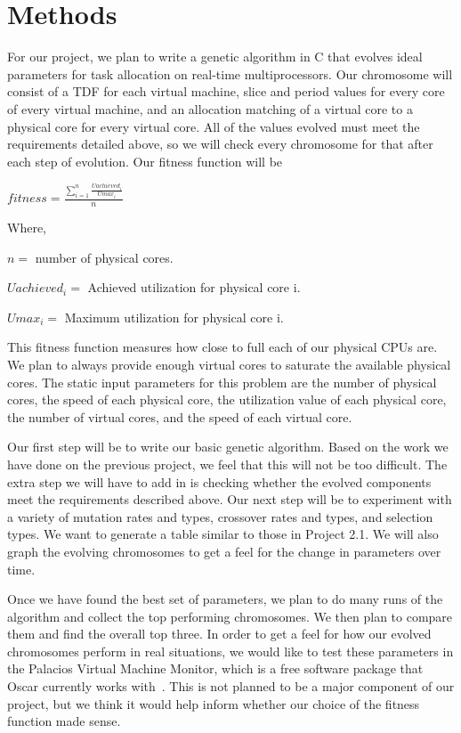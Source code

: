 \documentclass[11pt]{article}
\begin{document}
\section{Methods}

For our project, we plan to write a genetic algorithm in C that evolves ideal parameters for task allocation on real-time multiprocessors. Our chromosome will consist of a TDF for each virtual machine, slice and period values for every core of every virtual machine, and an allocation matching of a virtual core to a physical core for every virtual core. All of the values evolved must meet the requirements detailed above, so we will check every chromosome for that after each step of evolution. Our fitness function will be 

\begin{center}

$fitness = \frac{\sum_{i=1}^{n} \frac{Uachieved_i}{Umax_i}}{n}$

\begin{flushleft}
Where,

$n =$ number of physical cores.

$Uachieved_{i} =$ Achieved utilization for physical core i.

$Umax_{i} =$ Maximum utilization for physical core i.
\end{flushleft}

\end{center}

This fitness function measures how close to full each of our physical CPUs are. We plan to always provide enough virtual cores to saturate the available physical cores. The static input parameters for this problem are the number of physical cores, the speed of each physical core, the utilization value of each physical core, the number of virtual cores, and the speed of each virtual core.

Our first step will be to write our basic genetic algorithm. Based on the work we have done on the previous project, we feel that this will not be too difficult. The extra step we will have to add in is checking whether the evolved components meet the requirements described above. Our next step will be to experiment with a variety of mutation rates and types, crossover rates and types, and selection types. We want to generate a table similar to those in Project 2.1. We will also graph the evolving chromosomes to get a feel for the change in parameters over time.

Once we have found the best set of parameters, we plan to do many runs of the algorithm and collect the top performing chromosomes. We then plan to compare them and find the overall top three. In order to get a feel for how our evolved chromosomes perform in real situations, we would like to test these parameters in the Palacios Virtual Machine Monitor, which is a free software package that Oscar currently works with~\cite{Mondragon:13}. This is not planned to be a major component of our project, but we think it would help inform whether our choice of the fitness function made sense. 



\end{document}
